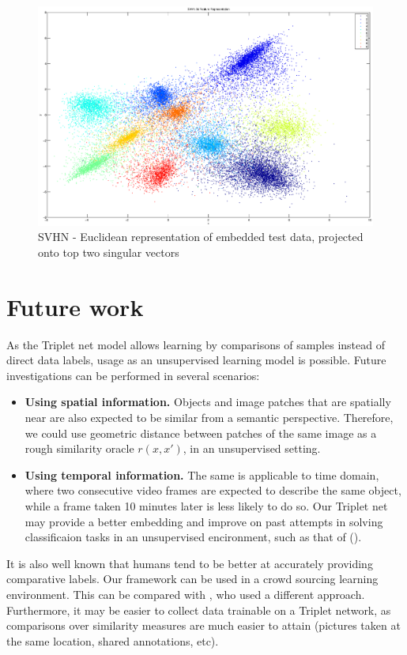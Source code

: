\documentclass{article} %
\begin{document}
\begin{figure}[h]
\begin{center}
\includegraphics[width=1\linewidth]{svhn-rep.eps}
\end{center}
   \caption{SVHN - Euclidean representation of embedded test data, projected onto top two singular vectors}\label{TripletRepCIFAR10}\label{TripletRepSVHN}
\end{figure}
\section{Future work}
As the Triplet net model allows learning by comparisons of samples instead of direct data labels, usage as an unsupervised learning model is possible.
Future investigations can be performed in several scenarios:
\begin{itemize}
 \item {\bf Using spatial information. }Objects and image patches that are spatially near are also expected to be similar from a semantic perspective. Therefore, we could use geometric distance between patches of the same image as a rough similarity oracle $r(x,x')$, in an unsupervised setting.  
\item {\bf Using temporal information.} The same is applicable to time domain, where two consecutive video frames are expected to describe the same object, while a frame taken 10 minutes later is less likely to do so.
Our Triplet net may provide a better embedding and improve on past attempts in solving classificaion
tasks in an unsupervised encironment, such as that of (\citet{mobahi2009deep}).
\end{itemize}
It is also well known that humans tend to be better at accurately providing comparative labels. Our framework can be used in a crowd sourcing learning environment. This can be compared with \citet{shamir}, who used a different approach.
Furthermore, it may be easier to collect data trainable on a Triplet network, as comparisons over similarity measures are much easier to attain (pictures taken at the same location, shared annotations, etc).
\end{document}
